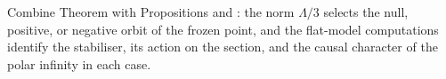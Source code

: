 Combine Theorem  with Propositions  and : the norm $\Lambda/3$ selects the null, positive, or negative orbit of the frozen point, and the flat-model computations identify the stabiliser, its action on the section, and the causal character of the polar infinity in each case.
